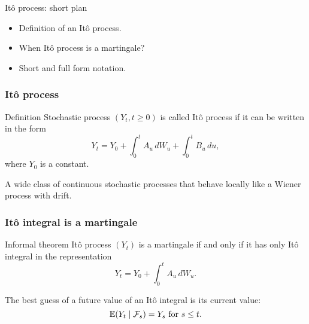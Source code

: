 

\begin{frame} %

    
    \end{frame}
    
    
    \begin{frame}{Itô process: short plan}
    
      \begin{itemize}[<+->]
        \item \alert{Definition} of an Itô process.
        \item When Itô process is a \alert{martingale}?
        \item \alert{Short} and \alert{full} form notation.
      \end{itemize}
    
    \end{frame}

\begin{frame}
    \frametitle{Itô process}

    \begin{block}{Definition\formalduck}
        Stochastic process $(Y_t, t\geq 0)$ is called \alert{Itô process} if it can be written in the form 
        \[
        Y_t = Y_0 + \int_0^t A_u \, dW_u + \int_0^t B_u \, du,
        \]
        where $Y_0$ is a constant.
    \end{block}

    \pause
    A wide class of continuous stochastic processes that behave \alert{locally} like a Wiener process with drift. 

\end{frame}


\begin{frame}
    \frametitle{Itô integral is a martingale}

    \begin{block}{Informal theorem\informalduck}
        Itô process $(Y_t)$ is a martingale if and only if it has only Itô integral in the representation
        \[
        Y_t = Y_0 + \int_0^t A_u \, dW_u.
        \]
    \end{block}

    \pause
    The best guess of a future value of an Itô integral is its current value:
    \pause
    \[
    \mathbb{E}(Y_t \mid \mathcal{F}_s) = Y_s \text{ for } s \leq t.
    \]

\end{frame}


